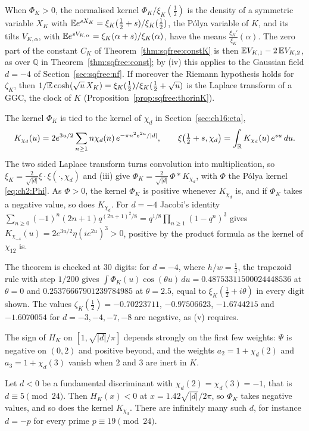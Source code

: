When $\Phi_K>0$, the normalised kernel $\Phi_K/\xi_K(\frac12)$ is the density of a symmetric variable $X_K$ with $\mathbb{E} e^{sX_K}=\xi_K(\frac12+s)/\xi_K(\frac12)$, the P\'olya variable of $K$, and its tilts $V_{K,\alpha}$, with $\mathbb{E} e^{sV_{K,\alpha}}=\xi_K(\alpha+s)/\xi_K(\alpha)$, have the means $\frac{\xi_K'}{\xi_K}(\alpha)$. The zero part of the constant $C_K$ of Theorem~\ref{thm:sqfree:constK} is then $\mathbb{E} V_{K,1}-2\,\mathbb{E} V_{K,2}$, as over $\mathbb Q$ in Theorem~\ref{thm:sqfree:const}; by (iv) this applies to the Gaussian field $d=-4$ of Section~\ref{sec:sqfree:nf}. If moreover the Riemann hypothesis holds for $\zeta_K$, then $1/\mathbb{E}\cosh(\sqrt u\,X_K)=\xi_K(\frac12)/\xi_K(\frac12+\sqrt u)$ is the Laplace transform of a GGC, the clock of $K$ (Proposition~\ref{prop:sqfree:thorinK}).

The kernel $\Phi_K$ is tied to the kernel of $\chi_d$ in Section~\ref{sec:ch16:eta},
\[
K_{\chi_d}(u)=2e^{3u/2}\sum_{n\ge1}n\chi_d(n)\,e^{-\pi n^2e^{2u}/|d|},\qquad \xi\big(\tfrac12+s,\chi_d\big)=\int_{\mathbb{R}}K_{\chi_d}(u)\,e^{su}\,du .
\]
The two sided Laplace transform turns convolution into multiplication, so $\xi_K=\frac2{\sqrt{|d|}}\xi\cdot\xi(\cdot,\chi_d)$ and (iii) give $\Phi_K=\frac2{\sqrt{|d|}}\,\Phi*K_{\chi_d}$, with $\Phi$ the P\'olya kernel \eqref{eq:ch2:Phi}. As $\Phi>0$, the kernel $\Phi_K$ is positive whenever $K_{\chi_d}$ is, and if $\Phi_K$ takes a negative value, so does $K_{\chi_d}$. For $d=-4$ Jacobi's identity $\sum_{n\ge0}(-1)^n(2n+1)q^{(2n+1)^2/8}=q^{1/8}\prod_{n\ge1}(1-q^n)^3$ gives $K_{\chi_{-4}}(u)=2e^{3u/2}\eta(ie^{2u})^3>0$, positive by the product formula as the kernel of $\chi_{12}$ is.

The theorem is checked at $30$ digits: for $d=-4$, where $h/w=\frac14$, the trapezoid rule with step $1/200$ gives $\int\Phi_K(u)\cos(\theta u)\,du=0.48753311500024448536$ at $\theta=0$ and $0.25376667901239784985$ at $\theta=2.5$, equal to $\xi_K(\frac12+i\theta)$ in every digit shown. The values $\zeta_K(\frac12)=-0.70223711$, $-0.97506623$, $-1.6744215$ and $-1.6070054$ for $d=-3,-4,-7,-8$ are negative, as (v) requires.

The sign of $H_K$ on $[1,\sqrt{|d|}/\pi]$ depends strongly on the first few weights: $\Psi$ is negative on $(0,2)$ and positive beyond, and the weights $a_2=1+\chi_d(2)$ and $a_3=1+\chi_d(3)$ vanish when $2$ and $3$ are inert in $K$.

\begin{theorem}\label{thm:sqfree:inert}
Let $d<0$ be a fundamental discriminant with $\chi_d(2)=\chi_d(3)=-1$, that is $d\equiv5\pmod{24}$. Then $H_K(x)<0$ at $x=1.42\sqrt{|d|}/2\pi$, so $\Phi_K$ takes negative values, and so does the kernel $K_{\chi_d}$. There are infinitely many such $d$, for instance $d=-p$ for every prime $p\equiv19\pmod{24}$.
\end{theorem}


